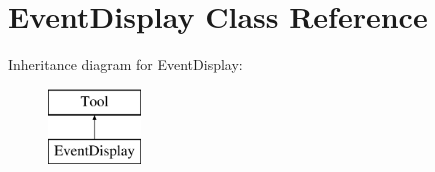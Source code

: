 \hypertarget{classEventDisplay}{\section{Event\-Display Class Reference}
\label{classEventDisplay}
}
Inheritance diagram for Event\-Display\-:\begin{figure}[H]
\begin{center}
\leavevmode
\includegraphics[height=2.000000cm]{classEventDisplay}
\end{center}
\end{figure}
